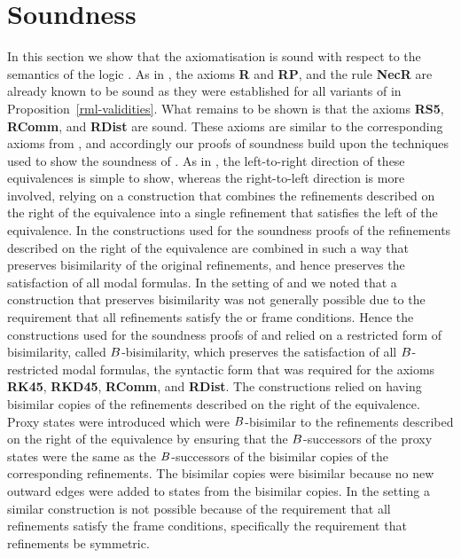 \section{Soundness}\label{rml-s5-soundness}

In this section we show that the axiomatisation \axiomRmlS{} is sound with respect to the semantics of the logic \logicRmlS{}.
As in \logicRmlK{}, the axioms {\bf R} and {\bf RP}, and the rule {\bf NecR} are already known to be sound as they were established for all variants of \logicRml{} in Proposition~\ref{rml-validities}.
What remains to be shown is that the axioms {\bf RS5}, {\bf RComm}, and {\bf RDist} are sound.
These axioms are similar to the corresponding axioms from \axiomRmlK{}, and accordingly our proofs of soundness build upon the techniques used to show the soundness of \axiomRmlK{}.
As in \axiomRmlK{}, the left-to-right direction of these equivalences is simple to show, whereas the right-to-left direction is more involved, relying on a construction that combines the refinements described on the right of the equivalence into a single refinement that satisfies the left of the equivalence.
In the constructions used for the soundness proofs of \axiomRmlK{} the refinements described on the right of the equivalence are combined in such a way that preserves bisimilarity of the original refinements, and hence preserves the satisfaction of all modal formulas.
In the setting of \logicRmlKFF{} and \logicRmlKD{} we noted that a construction that preserves bisimilarity was not generally possible due to the requirement that all refinements satisfy the \classKFF{} or \classKD{} frame conditions.
Hence the constructions used for the soundness proofs of \axiomRmlKFF{} and \axiomRmlKD{} relied on a restricted form of bisimilarity, called $B$-bisimilarity, which preserves the satisfaction of all $B$-restricted modal formulas, the syntactic form that was required for the axioms {\bf RK45}, {\bf RKD45}, {\bf RComm}, and {\bf RDist}.
The constructions relied on having bisimilar copies of the refinements described on the right of the equivalence.
Proxy states were introduced which were $B$-bisimilar to the refinements described on the right of the equivalence by ensuring that the $B$-successors of the proxy states were the same as the $B$-successors of the bisimilar copies of the corresponding refinements.
The bisimilar copies were bisimilar because no new outward edges were added to states from the bisimilar copies.
In the setting \logicRmlS{} a similar construction is not possible because of the requirement that all refinements satisfy the \classS{} frame conditions, specifically the requirement that refinements be symmetric.
